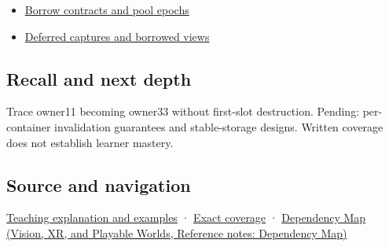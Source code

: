 \hypertarget{appendix-f9b8b9188c7f-used-by}{}

\begin{itemize}
\tightlist
\item
  \hyperref[appendix-aa405b7c3903]{Borrow contracts and pool epochs}
\item
  \hyperref[appendix-aea529eb5175]{Deferred captures and borrowed views}
\end{itemize}

\subsection{Recall and next depth}\label{appendix-f9b8b9188c7f-recall-and-next-depth}

\hypertarget{appendix-f9b8b9188c7f-recall-and-next-depth}{}

Trace owner11 becoming owner33 without first-slot destruction. Pending: per-container invalidation guarantees and stable-storage designs. Written coverage does not establish learner mastery.

\subsection{Source and navigation}\label{appendix-f9b8b9188c7f-source-and-navigation}

\hypertarget{appendix-f9b8b9188c7f-source-and-navigation}{}

\hyperref[01-foundations-i-ch003-when-a-valid-borrow-stops-naming-the-intended-thing]{Teaching explanation and examples} · \hyperref[appendix-fd090d982a15-m008---parts-113-126]{Exact coverage} · \href{../07-Vision-XR-and-Playable-Worlds/main.pdf\#nameddest=appendix-4ad47bdd269a}{Dependency Map (Vision, XR, and Playable Worlds, Reference notes: Dependency Map)}
